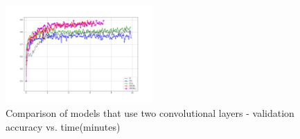 \begin{figure}[htb!]
\centering\includegraphics[width=0.50\textwidth]{content/CL-CCL-CCLL-CMCML-CMCMLL.png}
\caption[Two convolutional layers]{\label{fig:twoconvs}Comparison of models that use two convolutional layers - validation accuracy vs. time(minutes)}
\end{figure}
